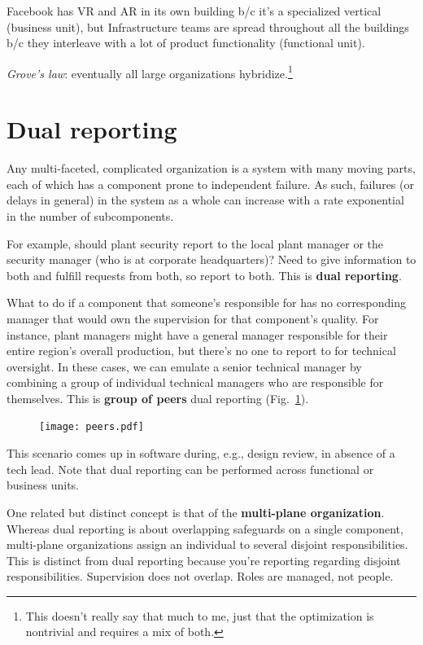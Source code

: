 \documentclass{article}
\begin{document}
  Facebook has VR and AR in its own building b/c it's a specialized vertical (business unit), but Infrastructure teams are spread throughout all the buildings b/c they interleave with a lot of product functionality (functional unit).

\textit{Grove's law}: eventually all large organizations hybridize.\footnote{This doesn't really say that much to me, just that the optimization is nontrivial and requires a mix of both.}

\section{Dual reporting}

Any multi-faceted, complicated organization is a system with many moving parts, each of which has a component prone to independent failure. As such, failures (or delays in general) in the system as a whole can increase with a rate exponential in the number of subcomponents.

For example, should plant security report to the local plant manager or the security manager (who is at corporate headquarters)? Need to give information to both and fulfill requests from both, so report to both. This is \textbf{dual reporting}.

What to do if a component that someone's responsible for has no corresponding manager that would own the supervision for that component's quality. For instance, plant managers might have a general manager responsible for their entire region's overall production, but there's no one to report to for technical oversight. In these cases, we can emulate a senior technical manager by combining a group of individual technical managers who are responsible for themselves. This is \textbf{group of peers} dual reporting (Fig.~\ref{fig:peers}).

\begin{figure}[ht]
  \centering
  \texttt{[image: peers.pdf]}
  \caption{\label{fig:peers} }
\end{figure}

This scenario comes up in software during, e.g., design review, in absence of a tech lead. Note that dual reporting can be performed across functional or business units.

One related but distinct concept is that of the \textbf{multi-plane organization}. Whereas dual reporting is about overlapping safeguards on a single component, multi-plane organizations assign an individual to several disjoint responsibilities. This is distinct from dual reporting because you’re reporting regarding disjoint responsibilities. Supervision does not overlap. Roles are managed, not people.
\end{document}
